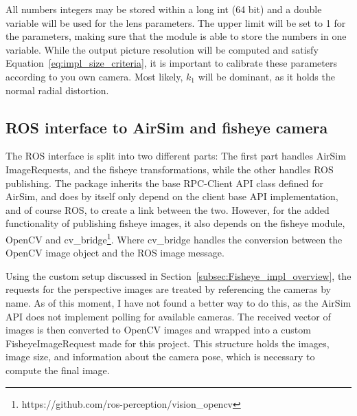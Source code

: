 All numbers integers may be stored within a long int (64 bit) and a double variable will be used for the lens parameters. The upper limit will be set to 1 for the parameters, making sure that the module is able to store the numbers in one variable. While the output picture resolution will be computed and satisfy Equation~\eqref{eq:impl_size_criteria}, it is important to calibrate these parameters according to you own camera. Most likely, $k_1$ will be dominant, as it holds the normal radial distortion.

\subsection{ROS interface to AirSim and fisheye camera}\label{subsec:ROS_interface}

The ROS interface is split into two different parts: The first part handles AirSim ImageRequests, and the fisheye transformations, while the other handles ROS publishing. The package inherits the base RPC-Client API class defined for AirSim, and does by itself only depend on the client base API implementation, and of course ROS, to create a link between the two. However, for the added functionality of publishing fisheye images, it also depends on the fisheye module, OpenCV and cv\_bridge\footnote{https://github.com/ros-perception/vision\_opencv}. Where cv\_bridge handles the conversion between the OpenCV image object and the ROS image message.

Using the custom setup discussed in Section~\ref{subsec:Fisheye_impl_overview}, the requests for the perspective images are treated by referencing the cameras by name. As of this moment, I have not found a better way to do this, as the AirSim API does not implement polling for available cameras. The received vector of images is then converted to OpenCV images and wrapped into a custom FisheyeImageRequest made for this project. This structure holds the images, image size, and information about the camera pose, which is necessary to compute the final image.


